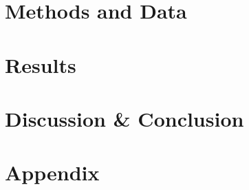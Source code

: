 \documentclass{article}
\begin{document}


\section{Methods and Data}\label{sec:methods}




\section{Results}\label{sec:results}




\section{Discussion \& Conclusion}\label{sec:conclusion}







\section{Appendix}\label{sec:appendix}

\end{document}
